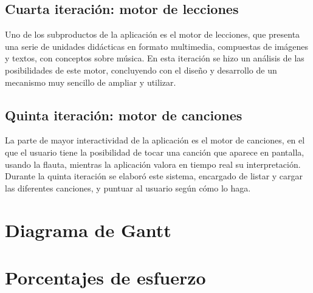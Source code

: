 \subsection{Cuarta iteración: motor de lecciones}
Uno de los subproductos de la aplicación es el motor de lecciones, que
presenta una serie de unidades didácticas en formato multimedia,
compuestas de imágenes y textos, con conceptos sobre música. En esta
iteración se hizo un análisis de las posibilidades de este motor,
concluyendo con el diseño y desarrollo de un mecanismo muy sencillo de
ampliar y utilizar.

\subsection{Quinta iteración: motor de canciones}
La parte de mayor interactividad de la aplicación es el motor de
canciones, en el que el usuario tiene la posibilidad de tocar una
canción que aparece en pantalla, usando la flauta, mientras la
aplicación valora en tiempo real su interpretación. Durante la quinta
iteración se elaboró este sistema, encargado de listar y cargar las
diferentes canciones, y puntuar al usuario según cómo lo haga.

\section{Diagrama de Gantt}

\section{Porcentajes de esfuerzo}
